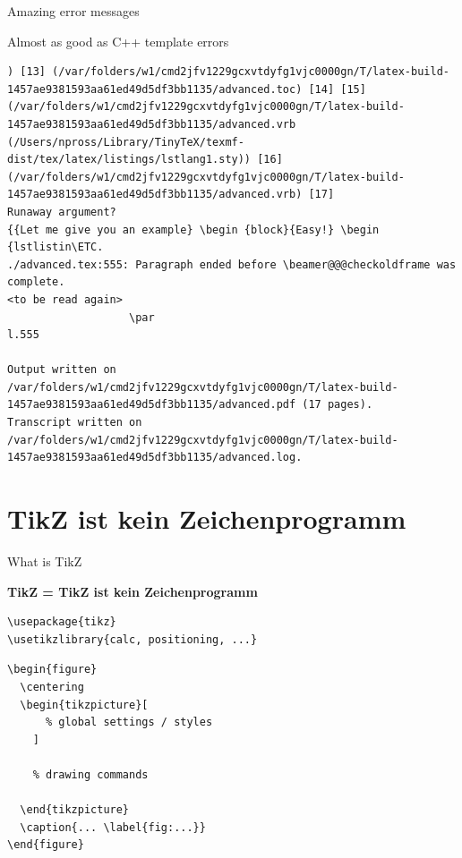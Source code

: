 \documentclass[xetex, onlymath, handout]{beamer}
\begin{document}
\begin{frame}[fragile]{Amazing error messages}
  \begin{block}{Almost as good as C++ template errors}
    \footnotesize
    \begin{verbatim}
) [13] (/var/folders/w1/cmd2jfv1229gcxvtdyfg1vjc0000gn/T/latex-build-1457ae9381593aa61ed49d5df3bb1135/advanced.toc) [14] [15] (/var/folders/w1/cmd2jfv1229gcxvtdyfg1vjc0000gn/T/latex-build-1457ae9381593aa61ed49d5df3bb1135/advanced.vrb (/Users/npross/Library/TinyTeX/texmf-dist/tex/latex/listings/lstlang1.sty)) [16] (/var/folders/w1/cmd2jfv1229gcxvtdyfg1vjc0000gn/T/latex-build-1457ae9381593aa61ed49d5df3bb1135/advanced.vrb) [17]
Runaway argument?
{{Let me give you an example} \begin {block}{Easy!} \begin {lstlistin\ETC.
./advanced.tex:555: Paragraph ended before \beamer@@@checkoldframe was complete.
<to be read again> 
                   \par 
l.555 
      
Output written on /var/folders/w1/cmd2jfv1229gcxvtdyfg1vjc0000gn/T/latex-build-1457ae9381593aa61ed49d5df3bb1135/advanced.pdf (17 pages).
Transcript written on /var/folders/w1/cmd2jfv1229gcxvtdyfg1vjc0000gn/T/latex-build-1457ae9381593aa61ed49d5df3bb1135/advanced.log.
    \end{verbatim}
  \end{block}
\end{frame}

\section{TikZ ist kein Zeichenprogramm}

\begin{frame}[fragile]{What is TikZ}

{\Large\bfseries TikZ = TikZ ist kein Zeichenprogramm}
\begin{lstlisting}
\usepackage{tikz}
\usetikzlibrary{calc, positioning, ...}
\end{lstlisting}
\begin{lstlisting}
\begin{figure}
  \centering
  \begin{tikzpicture}[
      % global settings / styles
    ]

    % drawing commands

  \end{tikzpicture}
  \caption{... \label{fig:...}}
\end{figure}
\end{lstlisting}
\end{frame}
\end{document}
